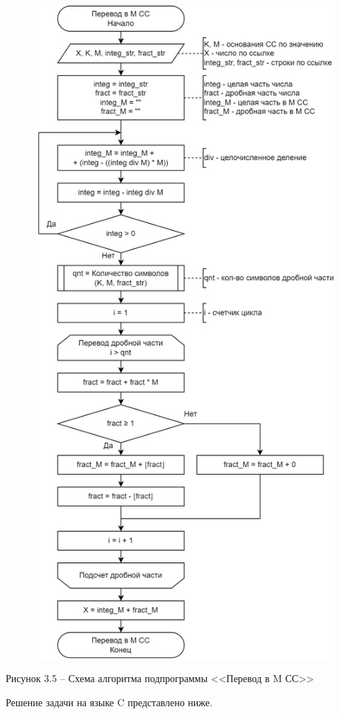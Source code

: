 \documentclass[a4paper,14pt]{extarticle}
\begin{document}
	\begin{figure}[h]
		\centering
		\includegraphics[width=0.54\linewidth]{schemes/s-3-5}
	\end{figure}
	\begin{center}
		Рисунок 3.5 – Схема алгоритма подпрограммы <<Перевод в M СС>>
	\end{center}
	\pagebreak
	
	Решение задачи на языке C представлено ниже.
	
\end{document}
